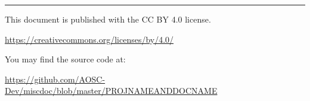 

\newcommand{\safelink}[1]{
    \href{#1}{\textcolor{black!75}{#1}}
}


\clearpage
\hspace{1mm}
\vfill\par
\begin{minipage}{\linewidth}
    \sffamily
    \linespread{1.5}
    \color{black!75}\raggedright\fontsize{9pt}{10pt}\selectfont
    \hrule
    \vspace{10pt}

    This document is published with the CC BY 4.0 license.
    
    \safelink{https://creativecommons.org/licenses/by/4.0/}

    You may find the source code at:

    \safelink{https://github.com/AOSC-Dev/miscdoc/blob/master/PROJNAMEANDDOCNAME}
\end{minipage}


